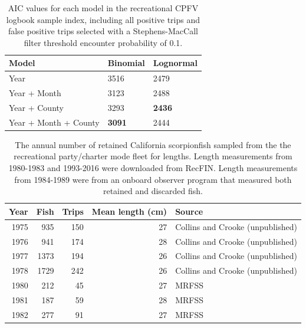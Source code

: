 \documentclass[12pt,]{article}
\begin{document}
\begin{table}[ht]
\centering
\caption{AIC values for each model in the
                                          recreational CPFV logbook sample 
                                          index, including all positive trips 
                                          and false positive trips selected 
                                          with a Stephens-MacCall filter 
                                          threshold encounter probability of 0.1.} 
\label{tab:Fleet5_RecPC_dockside_aic}
\begin{tabular}{lll}
  \hline
Model & Binomial & Lognormal \\ 
  \hline
Year & 3516 & 2479 \\ 
  Year + Month & 3123 & 2488 \\ 
  Year + County & 3293 & \textbf{2436} \\ 
  Year + Month + County & \textbf{3091} & 2444 \\ 
   \hline
\end{tabular}
\end{table}\begin{table}[ht]
\centering
\caption{The annual number of retained California scorpionfish 
                                              sampled from the the recreational party/charter 
                                              mode fleet for lengths. Length measurements
                                            from 1980-1983 and 1993-2016 were downloaded from RecFIN.  
                                            Length measurements from 1984-1989 were from an onboard
                                            observer program that measured both retained and discarded
                                            fish.} 
\label{tab:Fleet5_lengthsample}
\begin{tabular}{rrrrl}
  \hline
Year & Fish & Trips & Mean length (cm) & Source \\ 
  \hline
1975 & 935 & 150 & 27 & Collins and Crooke (unpublished) \\ 
  1976 & 941 & 174 & 28 & Collins and Crooke (unpublished) \\ 
  1977 & 1373 & 194 & 26 & Collins and Crooke (unpublished) \\ 
  1978 & 1729 & 242 & 26 & Collins and Crooke (unpublished) \\ 
  1980 & 212 & 45 & 27 & MRFSS \\ 
  1981 & 187 & 59 & 28 & MRFSS \\ 
  1982 & 277 & 91 & 27 & MRFSS \\ 

\end{tabular}
\end{table}
\end{document}
